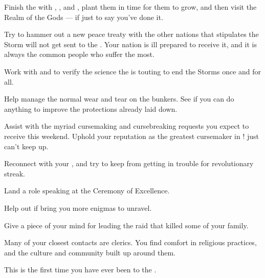 \documentclass[char]{GL2020}
\begin{document}
\begin{itemz}
    \item Finish the \iBeansNB{} with \cFlowPriest{}, \cAssistantScientist{}, and \cAmbition{}, plant them in time for them to grow, and then visit the Realm of the Gods — if just to say you've done it.
    \item Try to hammer out a new peace treaty with the other nations that stipulates the Storm will not get sent to the \pFarm{}. Your nation is ill prepared to receive it, and it is always the common people who suffer the most.
    \item Work with \cHedonist{} and \cAssistantScientist{} to verify the science the \pTech{} is touting to end the Storms once and for all.
    \item Help \cBunker{} manage the normal wear and tear on the bunkers. See if you can do anything to improve the protections already laid down.
\end{itemz}

\begin{itemz}
    \item Assist with the myriad cursemaking and cursebreaking requests you expect to receive this weekend. Uphold your reputation as the greatest cursemaker in \pEarth{}! \cPrince{} just can’t keep up.
    \item Reconnect with your \cChupLeader{\nibling} \cChupLeader{}, and try to keep \cChupLeader{\them} from getting in trouble for \cChupLeader{\their} revolutionary streak.
    \item Land a role speaking at the Ceremony of Excellence.
    \item Help \cChupSecond{} out if \cChupSecond{\they} bring\cChupSecond{\verbs} you more enigmas to unravel.
  \item Give \cJuniorStatesman{} a piece of your mind for leading the raid that killed some of your family.
\end{itemz}

\begin{itemz}[Notes]
    \item Many of your closest contacts are clerics. You find comfort in religious practices, and the culture and community built up around them.
    \item This is the first time you have ever been to the \pSchool{}.
\end{itemz}
\end{document}
